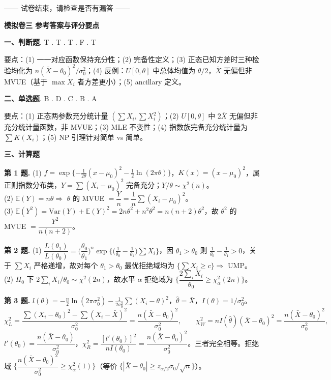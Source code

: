 \documentclass[12pt,a4paper]{ctexart}
\newcommand{\E}{\mathbb{E}}
\newcommand{\Var}{\mathrm{Var}}
\begin{document}
\vfill
\begin{center}\small —— 试卷结束，请检查是否有漏答 ——\end{center}

\newpage
\begin{center}{\Large\bfseries 模拟卷三 \quad 参考答案与评分要点}\end{center}

\noindent\textbf{一、判断题}. T . T . T . F . T\par
\smallskip
\noindent 要点：(1) 一一对应函数保持充分性；(2) 完备性定义；(3) 正态已知方差时三种检验均化为 $n(\bar X-\theta_0)^2/\sigma_0^2$；(4) 反例：$U[0,\theta]$ 中总体均值为 $\theta/2$，$\bar X$ 无偏但非 MVUE（基于 $\max X_i$ 者方差更小）；(5) ancillary 定义。

\medskip
\noindent\textbf{二、单选题}. B . D . C . B . A\par
\smallskip
\noindent 要点：(1) 正态两参数充分统计量 $(\sum X_i,\sum X_i^2)$；(2) $U[0,\theta]$ 中 $2\bar X$ 无偏但非充分统计量函数，非 MVUE；(3) MLE 不变性；(4) 指数族完备充分统计量为 $\sum K(X_i)$；(5) NP 引理针对简单 vs 简单。

\medskip
\noindent\textbf{三、计算题}

\smallskip
\noindent\textbf{第 1 题.}\;
(1) $f=\exp\{-\tfrac1{2\theta}(x-\mu_0)^2-\tfrac12\ln(2\pi\theta)\}$，$K(x)=(x-\mu_0)^2$，属正则指数分布类，$Y=\sum(X_i-\mu_0)^2$ 完备充分；$Y/\theta\sim\chi^2(n)$。\\
(2) $\E(Y)=n\theta\Rightarrow$ $\theta$ 的 MVUE $=\dfrac{Y}{n}=\dfrac1n\sum(X_i-\mu_0)^2$。\\
(3) $\E(Y^2)=\Var(Y)+\E(Y)^2=2n\theta^2+n^2\theta^2=n(n+2)\theta^2$，故 $\theta^2$ 的 MVUE $=\boxed{\dfrac{Y^2}{n(n+2)}}$。

\smallskip
\noindent\textbf{第 2 题.}\;
(1) $\dfrac{L(\theta_1)}{L(\theta_0)}=\Big(\dfrac{\theta_0}{\theta_1}\Big)^n\exp\Big\{\big(\tfrac1{\theta_0}-\tfrac1{\theta_1}\big)\sum X_i\Big\}$，因 $\theta_1>\theta_0$ 则 $\tfrac1{\theta_0}-\tfrac1{\theta_1}>0$，关于 $\sum X_i$ 严格递增，故对每个 $\theta_1>\theta_0$ 最优拒绝域均为 $\{\sum X_i\ge c\}\Rightarrow$ UMP。\\
(2) $H_0$ 下 $2\sum_i X_i/\theta_0\sim\chi^2(2n)$，故水平 $\alpha$ 拒绝域为 $\Big\{\dfrac{2\sum_i X_i}{\theta_0}\ge\chi^2_\alpha(2n)\Big\}$。

\smallskip
\noindent\textbf{第 3 题.}\;
$l(\theta)=-\tfrac n2\ln(2\pi\sigma_0^2)-\tfrac1{2\sigma_0^2}\sum(X_i-\theta)^2$，$\hat\theta=\bar X$，$I(\theta)=1/\sigma_0^2$。
\[
\chi_L^2=\frac{\sum(X_i-\theta_0)^2-\sum(X_i-\bar X)^2}{\sigma_0^2}=\frac{n(\bar X-\theta_0)^2}{\sigma_0^2},\qquad
\chi_W^2=nI(\hat\theta)(\bar X-\theta_0)^2=\frac{n(\bar X-\theta_0)^2}{\sigma_0^2},
\]
$l'(\theta_0)=\dfrac{n(\bar X-\theta_0)}{\sigma_0^2}$，$\chi_R^2=\dfrac{[l'(\theta_0)]^2}{nI(\theta_0)}=\dfrac{n(\bar X-\theta_0)^2}{\sigma_0^2}$。三者完全相等。拒绝域 $\Big\{\dfrac{n(\bar X-\theta_0)^2}{\sigma_0^2}\ge\chi^2_\alpha(1)\Big\}$（等价 $\{|\bar X-\theta_0|\ge z_{\alpha/2}\sigma_0/\sqrt n\}$）。
\end{document}
